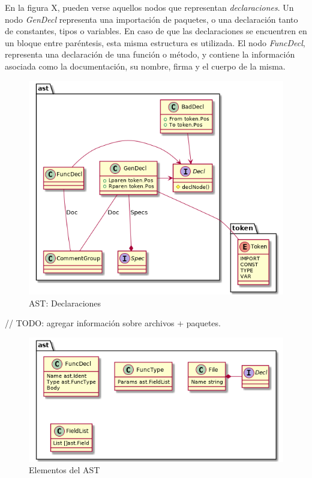 En la figura X, pueden verse aquellos nodos que representan \textit{declaraciones}.
Un nodo \textit{GenDecl} representa una importación de paquetes, o una declaración tanto de
constantes, tipos o variables.
En caso de que las declaraciones se encuentren en un bloque entre paréntesis, esta misma
estructura es utilizada.
El nodo \textit{FuncDecl}, representa una declaración de una función o método, y contiene
la información asociada como la documentación, su nombre, firma y el cuerpo de la misma.

\begin{figure}[H]
  \includegraphics[width=12cm]{implementation/ast_decls.png}
  \centering
  \caption{AST: Declaraciones}
\end{figure}

// TODO: agregar información sobre archivos + paquetes.

\begin{figure}[H]
  \includegraphics[width=12cm]{implementation/elements}
  \centering
  \caption{Elementos del AST}
\end{figure}
